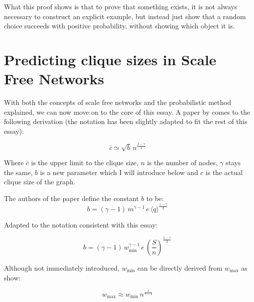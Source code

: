 \documentclass[12pt, a4paper]{article}   %
\begin{document}
What this proof shows is that to prove that something exists, it is not always necessary to construct an explicit example, but instead just show that a random choice succeeds with positive probability, without showing which object it is.




\section{Predicting clique sizes in Scale Free Networks} \label{sec:predicting-clique-sizes}

With both the concepts of scale free networks and the probabilistic method explained, we can now move on to the core of this essay. A paper by \textcite{bianconiNumberCliquesRandom2006} comes to the following derivation (the notation has been slightly adapted to fit the rest of this essay):


\begin{equation} \label{eq:bianconi-marsili-bound}
    \bar{c} \simeq \sqrt{b}\, n^{\frac{3-\gamma}{4}}
\end{equation}

Where \( \bar{c} \) is the upper limit to the clique size, \( n \) is the number of nodes, \( \gamma \) stays the same, \( b \) is a new parameter which I will introduce below and \( c \) is the actual clique size of the graph. 

The authors of the paper define the constant \( b \) to be:
\begin{equation} \label{eq:b-original-bianconi-marsili}
b = (\gamma - 1)\, m^{\gamma - 1}\, e\, \langle q \rangle^{\frac{1-\gamma}{2}}
\end{equation}

Adapted to the notation consistent with this essay:

\begin{equation} \label{eq:b-adapted}
b = (\gamma - 1)\, w_{\text{min}}^{\gamma - 1}\, e\, \left (\frac{S}{n} \right ) ^{\frac{1-\gamma}{2}}
\end{equation}

Although not immediately introduced, \( w_{\text{min}} \) can be directly derived from \( w_{\text{max}} \) as \textcite{fasinoGeneratingLargeScalefree2021} show:

\begin{equation} \label{eq:wmax-wmin-relation}
    w_{\text{max}} \approx w_{\text{min}}\, n^{\frac{1}{\gamma - 1}}
\end{equation}
\end{document}
